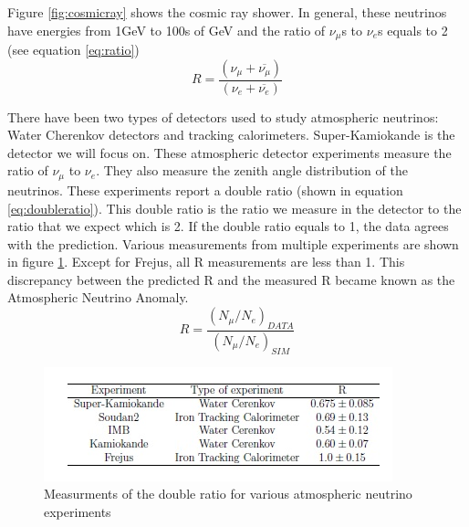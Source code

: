 Figure \ref{fig:cosmicray} shows the cosmic ray shower. In general, these neutrinos have energies from 1GeV to 100s of GeV and the ratio of $\nu_{\mu}$s to $\nu_{e}$s equals to 2 (see equation \ref{eq:ratio})
\begin{equation}
\label{eq:ratio}
R = \frac{(\nu_{\mu} + \overline{\nu_{\mu}})}{(\nu_{e} + \overline{\nu_{e}})}
\end{equation} 



There have been two types of detectors used to study atmospheric neutrinos: Water Cherenkov detectors and tracking calorimeters. Super-Kamiokande is the detector we will focus on. These atmospheric detector experiments measure the ratio of $\nu_{\mu}$ to $\nu_{e}$. They also measure the zenith angle distribution of the neutrinos. These experiments report a double ratio (shown in equation \ref{eq:doubleratio}). This double ratio is the ratio we measure in the detector to the ratio that we expect which is 2. If the double ratio equals to 1, the data agrees with the prediction. Various measurements from multiple experiments are shown in figure \ref{fig:ratiotable}. Except for Frejus, all R measurements are less than 1. This discrepancy between the predicted R and the measured R became known as the Atmospheric Neutrino Anomaly.
\begin{equation}
\label{eq:doubleratio}
R = \frac{(N_{\mu}/N_{e})_{DATA}}{(N_{\mu}/N_{e})_{SIM}}
\end{equation}

\begin{figure}[htp]
\centering
\includegraphics[scale=1]{figs/ratio.jpg}
\caption{Measurments of the double ratio for various atmospheric neutrino experiments}
\label{fig:ratiotable}
\end{figure}

